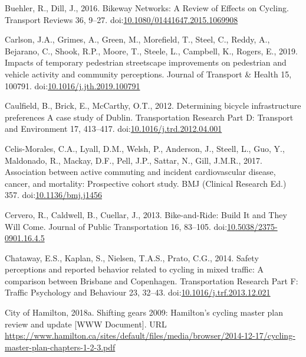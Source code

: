 \documentclass[]{elsarticle} %
\begin{document}
\leavevmode\hypertarget{ref-buehlerBikewayNetworksReview2016b}{}%
Buehler, R., Dill, J., 2016. Bikeway Networks: A Review of Effects on
Cycling. Transport Reviews 36, 9--27.
doi:\href{https://doi.org/10.1080/01441647.2015.1069908}{10.1080/01441647.2015.1069908}

\leavevmode\hypertarget{ref-carlsonImpactsTemporaryPedestrian2019}{}%
Carlson, J.A., Grimes, A., Green, M., Morefield, T., Steel, C., Reddy,
A., Bejarano, C., Shook, R.P., Moore, T., Steele, L., Campbell, K.,
Rogers, E., 2019. Impacts of temporary pedestrian streetscape
improvements on pedestrian and vehicle activity and community
perceptions. Journal of Transport \& Health 15, 100791.
doi:\href{https://doi.org/10.1016/j.jth.2019.100791}{10.1016/j.jth.2019.100791}

\leavevmode\hypertarget{ref-caulfieldDeterminingBicycleInfrastructure2012}{}%
Caulfield, B., Brick, E., McCarthy, O.T., 2012. Determining bicycle
infrastructure preferences A case study of Dublin. Transportation
Research Part D: Transport and Environment 17, 413--417.
doi:\href{https://doi.org/10.1016/j.trd.2012.04.001}{10.1016/j.trd.2012.04.001}

\leavevmode\hypertarget{ref-celis-moralesAssociationActiveCommuting2017b}{}%
Celis-Morales, C.A., Lyall, D.M., Welsh, P., Anderson, J., Steell, L.,
Guo, Y., Maldonado, R., Mackay, D.F., Pell, J.P., Sattar, N., Gill,
J.M.R., 2017. Association between active commuting and incident
cardiovascular disease, cancer, and mortality: Prospective cohort study.
BMJ (Clinical Research Ed.) 357.
doi:\href{https://doi.org/10.1136/bmj.j1456}{10.1136/bmj.j1456}

\leavevmode\hypertarget{ref-cerveroBikeandRideBuildIt2013}{}%
Cervero, R., Caldwell, B., Cuellar, J., 2013. Bike-and-Ride: Build It
and They Will Come. Journal of Public Transportation 16, 83--105.
doi:\href{https://doi.org/10.5038/2375-0901.16.4.5}{10.5038/2375-0901.16.4.5}

\leavevmode\hypertarget{ref-chatawaySafetyPerceptionsReported2014}{}%
Chataway, E.S., Kaplan, S., Nielsen, T.A.S., Prato, C.G., 2014. Safety
perceptions and reported behavior related to cycling in mixed traffic: A
comparison between Brisbane and Copenhagen. Transportation Research Part
F: Traffic Psychology and Behaviour 23, 32--43.
doi:\href{https://doi.org/10.1016/j.trf.2013.12.021}{10.1016/j.trf.2013.12.021}

\leavevmode\hypertarget{ref-Cmp2009}{}%
City of Hamilton, 2018a. Shifting gears 2009: Hamilton's cycling master
plan review and update {[}WWW Document{]}. URL
\url{https://www.hamilton.ca/sites/default/files/media/browser/2014-12-17/cycling-master-plan-chapters-1-2-3.pdf}
\end{document}
